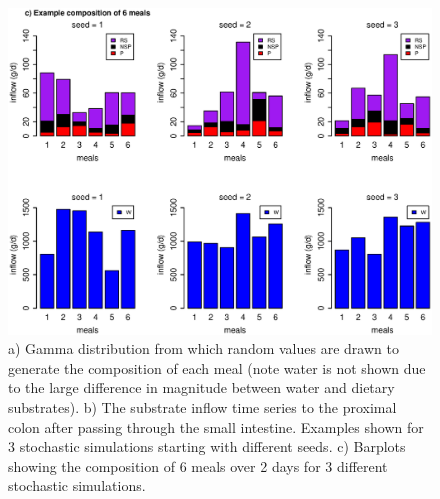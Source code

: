 \documentclass[a4paper]{article}
\begin{document}
\begin{figure}
    \includegraphics[scale=0.5]{images/inflowComp.eps}
    \caption{
a) Gamma distribution from which random values are drawn to generate the composition of each meal (note water is not shown due to the large difference in magnitude between water and dietary substrates). b) The substrate inflow time series to the proximal colon after passing through the small intestine. Examples shown for 3 stochastic simulations starting with different seeds. c) Barplots showing the composition of 6 meals over 2 days for 3 different stochastic simulations.}
    \label{fig:substrateInflow}
\end{figure}
\end{document}
